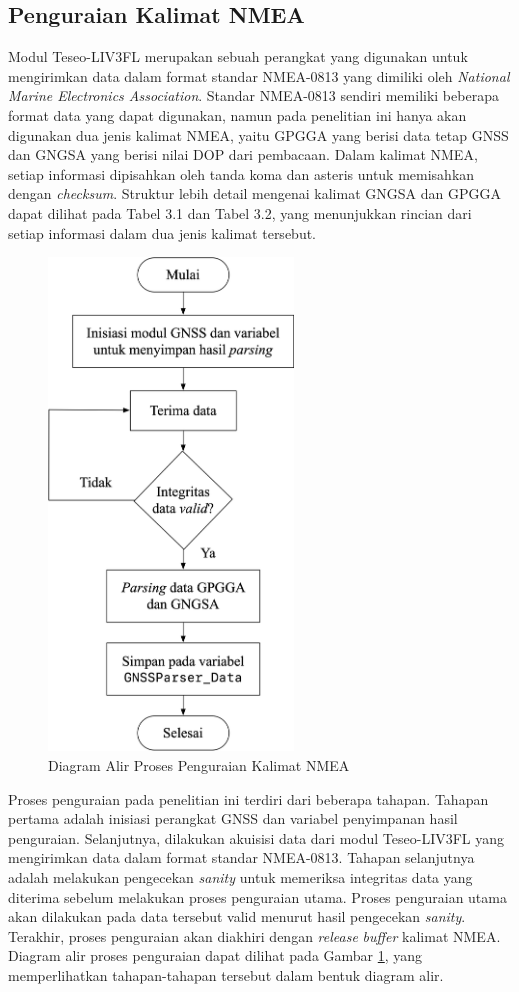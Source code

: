 \subsection{Penguraian Kalimat NMEA}
Modul Teseo-LIV3FL merupakan sebuah perangkat yang digunakan untuk mengirimkan data dalam format standar NMEA-0813 yang dimiliki oleh \textit{National Marine Electronics Association}. Standar NMEA-0813 sendiri memiliki beberapa format data yang dapat digunakan, namun pada penelitian ini hanya akan digunakan dua jenis kalimat NMEA, yaitu GPGGA yang berisi data tetap GNSS dan GNGSA yang berisi nilai DOP dari pembacaan. Dalam kalimat NMEA, setiap informasi dipisahkan oleh tanda koma dan asteris untuk memisahkan dengan \textit{checksum}. Struktur lebih detail mengenai kalimat GNGSA dan GPGGA dapat dilihat pada Tabel 3.1 dan Tabel 3.2, yang menunjukkan rincian dari setiap informasi dalam dua jenis kalimat tersebut.

\begin{figure}[H]
	\centering
	\includegraphics[width=6.5cm]{contents/chapter-3/diagram-parser.png}
	\caption{Diagram Alir Proses Penguraian Kalimat NMEA}
	\label{Fig: flowchart-parsing}
\end{figure}

Proses penguraian pada penelitian ini terdiri dari beberapa tahapan. Tahapan pertama adalah inisiasi perangkat GNSS dan variabel penyimpanan hasil penguraian. Selanjutnya, dilakukan akuisisi data dari modul Teseo-LIV3FL yang mengirimkan data dalam format standar NMEA-0813. Tahapan selanjutnya adalah melakukan pengecekan \textit{sanity} untuk memeriksa integritas data yang diterima sebelum melakukan proses penguraian utama. Proses penguraian utama akan dilakukan pada data tersebut valid menurut hasil pengecekan \textit{sanity}. Terakhir, proses penguraian akan diakhiri dengan \textit{release} \textit{buffer} kalimat NMEA. Diagram alir proses penguraian dapat dilihat pada Gambar \ref{Fig: flowchart-parsing}, yang memperlihatkan tahapan-tahapan tersebut dalam bentuk diagram alir.

